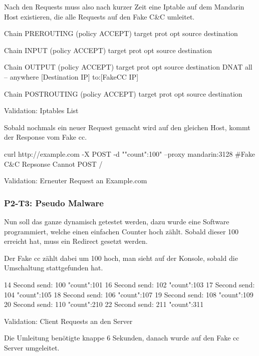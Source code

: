 Nach den Requests muss also nach kurzer Zeit eine Iptable auf dem Mandarin Host existieren, die alle Requests auf den Fake C\&C umleitet.

\begin{listing}[H]
\begin{fancycode}
Chain PREROUTING (policy ACCEPT)
target     prot opt source               destination         

Chain INPUT (policy ACCEPT)
target     prot opt source               destination         

Chain OUTPUT (policy ACCEPT)
target     prot opt source               destination         
DNAT       all  --  anywhere             [Destination IP]        to:[FakeCC IP]

Chain POSTROUTING (policy ACCEPT)
target     prot opt source               destination 
\end{fancycode}
\caption{Validation: Iptables List}
\label{lst:Iptables-list}
\end{listing}

Sobald nochmals ein neuer Request gemacht wird auf den gleichen Host, kommt der Response vom Fake \gls{cc}.

\begin{listing}[H]
\begin{fancycode}
curl http://example.com -X POST -d "{"count":100}" --proxy mandarin:3128
#Fake C&C Repsonse
Cannot POST /
\end{fancycode}
\caption{Validation: Erneuter Request an Example.com}
\label{lst:request-example-new}
\end{listing}

\subsubsection{P2-T3: Pseudo Malware}
Nun soll das ganze dynamisch getestet werden, dazu wurde eine Software programmiert, welche einen einfachen Counter hoch zählt. Sobald dieser 100 erreicht hat, muss ein Redirect gesetzt werden.

Der Fake \gls{cc} zählt dabei um 100 hoch, man sieht auf der Konsole, sobald die Umschaltung stattgefunden hat.

\begin{listing}[H]
\begin{jscode}
14 Second
send: 100
{"count":101}
16 Second
send: 102
{"count":103}
17 Second
send: 104
{"count":105}
18 Second
send: 106
{"count":107}
19 Second
send: 108
{"count":109}
20 Second
send: 110
{"count":210}
22 Second
send: 211
{"count":311}
\end{jscode}
\caption{Validation: Client Requests an den Server}
\label{lst:client-request-server}
\end{listing}
Die Umleitung benötigte knappe 6 Sekunden, danach wurde auf den Fake \gls{cc} Server umgeleitet.


